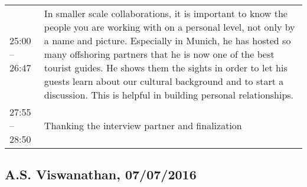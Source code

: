 \begin{appendix}
\begin{longtable}{l p{12.5cm}}
		25:00 -- 26:47&In smaller scale collaborations, it is important to know the people you are working with on a personal level, not only by a name and picture. Especially in Munich, he has hosted so many offshoring partners that he is now one of the best tourist guides. He shows them the sights in order to let his guests learn about our cultural background and to start a discussion. This is helpful in building personal relationships.\\
		27:55 -- 28:50&Thanking the interview partner and finalization\\
		
\end{longtable}

\tocless\subsection{A.S. Viswanathan, 07/07/2016}
\label{int:Viswanathan}


\end{appendix}
